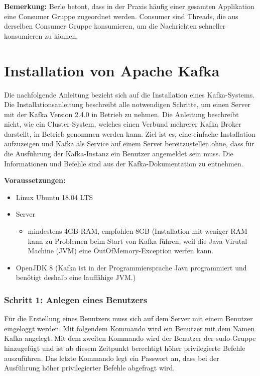 \documentclass[a4paper,titlepage,halfparskip,12pt]{scrreprt}
\begin{document}
\begin{onehalfspacing}
\textbf{Bemerkung:} Berle \cite{berleKafkaOverview} betont, dass in der Praxis häufig einer gesamten Applikation eine Consumer Gruppe zugeordnet werden. Consumer sind Threads, die aus derselben Consumer Gruppe konsumieren, um die Nachrichten schneller konsumieren zu können.

\pagebreak

\section{Installation von Apache Kafka}
\label{sec:InstallationKafka}

Die nachfolgende Anleitung bezieht sich auf die Installation eines Kafka-Systems. Die Installationsanleitung beschreibt alle notwendigen Schritte, um einen Server mit der Kafka Version 2.4.0 in Betrieb zu nehmen. Die Anleitung beschreibt nicht, wie ein Cluster-System, welches einen Verbund mehrerer Kafka Broker darstellt, in Betrieb genommen werden kann. Ziel ist es, eine einfache Installation aufzuzeigen und Kafka als Service auf einem Server bereitzustellen ohne, dass für die Ausführung der Kafka-Instanz ein Benutzer angemeldet sein muss. Die Informationen und Befehle sind aus der Kafka-Dokumentation \cite{kafkaDoc} zu entnehmen.

\bigskip

\textbf{Voraussetzungen:}

\smallskip

\begin{itemize}
\item Linux Ubuntu 18.04 LTS
\item Server
\begin{itemize}
\item mindestens 4GB RAM, empfohlen 8GB (Installation mit weniger RAM kann zu Problemen beim Start von Kafka führen, weil die Java Virutal Machine (JVM) eine \glqq OutOfMemory\grqq -Exception werfen kann.
\end{itemize}
\item OpenJDK 8 (Kafka ist in der Programmiersprache Java programmiert und benötigt deshalb eine lauffähige JVM.)
\end{itemize}

\subsubsection*{Schritt 1: Anlegen eines Benutzers}

Für die Erstellung eines Benutzers muss sich auf dem Server mit einem Benutzer eingeloggt werden. Mit folgendem Kommando wird ein Benutzer mit dem Namen Kafka angelegt. Mit dem zweiten Kommando wird der Benutzer der \glqq sudo\grqq -Gruppe hinzugefügt und ist ab diesem Zeitpunkt berechtigt höher privilegierte Befehle auszuführen. Das letzte Kommando legt ein Passwort an, dass bei der Ausführung höher privilegierter Befehle abgefragt wird.


\end{onehalfspacing}
\end{document}
